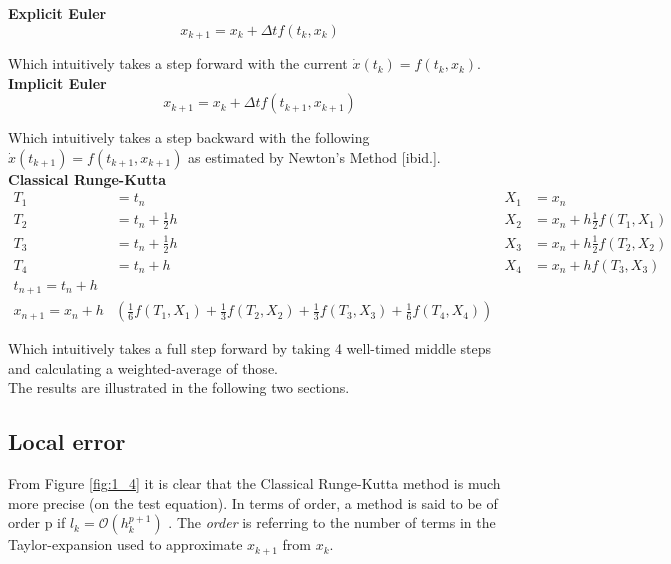 \textbf{Explicit Euler \cite{JrgensenScientificEquationsb}}
\begin{equation}
    x_{k+1}=x_{k}+\Delta t f\left(t_{k}, x_{k}\right)
\end{equation}

Which intuitively takes a step forward with the current $\dot{x}(t_k) = f(t_k,x_k)$.
\\
\textbf{Implicit Euler \cite{JrgensenScientificEquationsb}}
\begin{equation}
    x_{k+1}=x_{k}+\Delta t f\left(t_{k+1}, x_{k+1}\right)
\end{equation}

Which intuitively takes a step backward with the following $\dot{x}(t_{k+1}) =  f(t_{k+1},x_{k+1})$ as estimated by Newton's Method [ibid.].
\\
\textbf{Classical Runge-Kutta \cite{JrgensenRunge-KuttaEquations}}
$$
\begin{aligned}
T_{1} &=t_{n} & X_{1} &=x_{n} \\
T_{2} &=t_{n}+\frac{1}{2} h & X_{2} &=x_{n}+h \frac{1}{2} f\left(T_{1}, X_{1}\right) \\
T_{3} &=t_{n}+\frac{1}{2} h & X_{3} &=x_{n}+h \frac{1}{2} f\left(T_{2}, X_{2}\right) \\
T_{4} &=t_{n}+h & X_{4} &=x_{n}+h f\left(T_{3}, X_{3}\right) \\
 t_{n+1}=t_{n}+h & & \\
 x_{n+1}=x_{n}+h &\left(\frac{1}{6} f\left(T_{1}, X_{1}\right)+\frac{1}{3} f\left(T_{2}, X_{2}\right)+\frac{1}{3} f\left(T_{3}, X_{3}\right)+\frac{1}{6} f\left(T_{4}, X_{4}\right)\right)
\end{aligned}
$$

Which intuitively takes a full step forward by taking 4 well-timed middle steps and calculating a weighted-average of those.
\\

The results are illustrated in the following two sections.






\subsection{Local error}
From Figure \ref{fig:1_4} it is clear that the Classical Runge-Kutta method is much more precise (on the test equation). In terms of order, a method is said to be of order p if $l_{k}=\mathcal{O}\left(h_{k}^{p+1}\right)$ \cite{JrgensenScientificEquationsc}. The \textit{order} is referring to the number of terms in the Taylor-expansion used to approximate $x_{k+1}$ from $x_k$.

